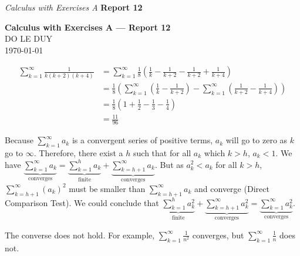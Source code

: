 

\newcommand{\myclass}{Calculus with Exercises A}
\newcommand{\myname}{DO LE DUY}
\newcommand{\myhwtype}{Report 12}
\newcommand{\questiontype}{Problem}
\newcommand{\writtensection}{12}
\newtheorem*{prop}{Proposition}
\usepackage{pgf,tikz,pgfplots}
\pgfplotsset{compat=1.15}
\usepackage{mathrsfs}
\usetikzlibrary{arrows}
\headrule
\header{{\myname}}%
{\emph{\myclass}}%
{\textbf{\myhwtype }}


\thispagestyle{empty}
\begin{center}
  {\Large \textbf{\myclass{} — \myhwtype{} }} \\
  {\myname{} } \\
  \today
\end{center}

\begin{numedquestion}
    \begin{align*}
        \sum_{k=1}^{\infty} \frac{1}{k(k+2)(k+4)} &= \sum_{k=1}^{\infty}\frac{1}{8} \left(\frac{1}{k} - \frac{1}{k+2} - \frac{1}{k+2} + \frac{1}{k+4} \right)\\
        &= \frac{1}{8} \left(\sum_{k=1}^{\infty}\left( \frac{1}{k} - \frac{1}{k+2}\right) - \sum_{k=1}^{\infty}\left( \frac{1}{k+2} - \frac{1}{k+4} \right) \right)\\
        &= \frac{1}{8} \left( 1 + \frac{1}{2} - \frac{1}{3} - \frac{1}{4} \right)\\
        &= \frac{11}{96}
    \end{align*}
    
    
\end{numedquestion} 

\begin{numedquestion}
    Because $\sum_{k=1}^{\infty} a_{k}$ is a convergent series of positive terms, $a_k$ will go to zero as $k$ go to $\infty$. Therefore, there exist a $h$ such that for all $a_k$ which $k>h$, $a_k < 1$. We have $\underbrace{\sum_{k=1}^{\infty} a_{k}}_\text{converges} = \underbrace{\sum_{k=1}^{h} a_{k}}_\text{finite} + \underbrace{\sum_{k=h+1}^{\infty} a_{k}}_\text{converges}$. But as $a_k^2 < a_{k}$ for all $k > h$, $\sum_{k=h+1}^{\infty} (a_{k})^2$ must be smaller than $\sum_{k=h+1}^{\infty} a_{k}$ and converge (Direct Comparison Test). We could conclude that $\underbrace{\sum_{k=1}^{h} a_{k}^2}_\text{finite} + \underbrace{\sum_{k=h+1}^{\infty} a_{k}^2}_\text{converges} = \underbrace{\sum_{k=1}^{\infty} a_{k}^2}_\text{converges}$. 

    The converse does not hold. For example, $\sum_{k=1}^{\infty} \frac{1}{n^2}$ converges, but $\sum_{k=1}^{\infty} \frac{1}{n}$ does not.    
    
\end{numedquestion}

